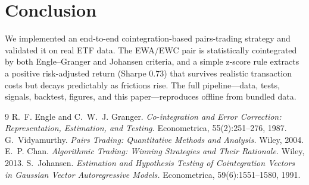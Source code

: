 \documentclass[11pt]{article}
\begin{document}
\section{Conclusion}
We implemented an end-to-end cointegration-based pairs-trading strategy and
validated it on real ETF data. The EWA/EWC pair is statistically cointegrated by
both Engle--Granger and Johansen criteria, and a simple z-score rule extracts a
positive risk-adjusted return (Sharpe $0.73$) that survives realistic
transaction costs but decays predictably as frictions rise. The full
pipeline---data, tests, signals, backtest, figures, and this paper---reproduces
offline from bundled data.

\begin{thebibliography}{9}
 R.~F. Engle and C.~W.~J. Granger.
\emph{Co-integration and Error Correction: Representation, Estimation, and
Testing.} Econometrica, 55(2):251--276, 1987.
 G.~Vidyamurthy.
\emph{Pairs Trading: Quantitative Methods and Analysis.} Wiley, 2004.
 E.~P. Chan.
\emph{Algorithmic Trading: Winning Strategies and Their Rationale.} Wiley, 2013.
 S.~Johansen.
\emph{Estimation and Hypothesis Testing of Cointegration Vectors in Gaussian
Vector Autoregressive Models.} Econometrica, 59(6):1551--1580, 1991.
\end{thebibliography}
\end{document}
